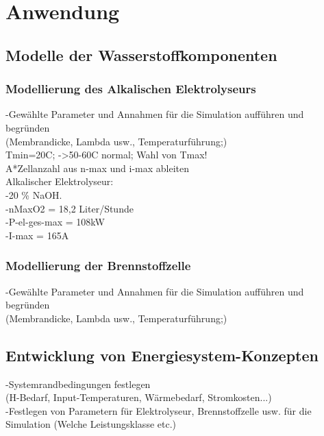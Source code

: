 \chapter{Anwendung}
\label{cha:Anwendung}

\section{Modelle der Wasserstoffkomponenten}

\subsection{Modellierung des Alkalischen Elektrolyseurs}
-Gewählte Parameter und Annahmen für die Simulation aufführen und begründen\\
(Membrandicke, Lambda usw., Temperaturführung;)\\
Tmin=20C; ->50-60C normal; Wahl von Tmax!\\
A*Zellanzahl aus n-max und i-max ableiten\\

Alkalischer Elektrolyseur:\\
-20 \% NaOH.\\
-nMaxO2 = 18,2 Liter/Stunde\\
-P-el-ges-max = 108kW\\
-I-max = 165A\\



\subsection{Modellierung der Brennstoffzelle}
-Gewählte Parameter und Annahmen für die Simulation aufführen und begründen\\
(Membrandicke, Lambda usw., Temperaturführung;)\\

\section{Entwicklung von Energiesystem-Konzepten}
-Systemrandbedingungen festlegen\\
(H-Bedarf, Input-Temperaturen, Wärmebedarf, Stromkosten...)\\
-Festlegen von Parametern für Elektrolyseur, Brennstoffzelle usw. für die Simulation (Welche Leistungsklasse etc.)\\

